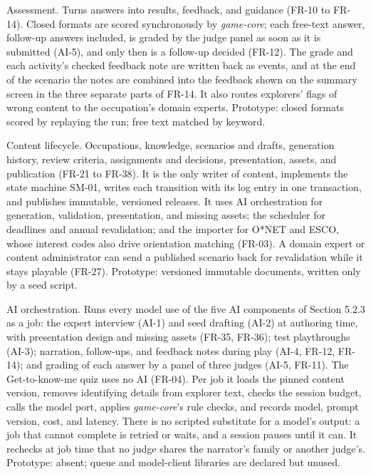 Assessment. Turns answers into results, feedback, and guidance (FR-10 to FR-14). Closed formats are scored synchronously by \textit{game-\allowbreak{}core}; each free-text answer, follow-up answers included, is graded by the judge panel as soon as it is submitted (AI-5), and only then is a follow-up decided (FR-12). The grade and each activity's checked feedback note are written back as events, and at the end of the scenario the notes are combined into the feedback shown on the summary screen in the three separate parts of FR-14. It also routes explorers' flags of wrong content to the occupation's domain experts. Prototype: closed formats scored by replaying the run; free text matched by keyword.

Content lifecycle. Occupations, knowledge, scenarios and drafts, generation history, review criteria, assignments and decisions, presentation, assets, and publication (FR-21 to FR-38). It is the only writer of content, implements the state machine SM-01, writes each transition with its log entry in one transaction, and publishes immutable, versioned releases. It uses AI orchestration for generation, validation, presentation, and missing assets; the scheduler for deadlines and annual revalidation; and the importer for O*NET and ESCO, whose interest codes also drive orientation matching (FR-03). A domain expert or content administrator can send a published scenario back for revalidation while it stays playable (FR-27). Prototype: versioned immutable documents, written only by a seed script.

AI orchestration. Runs every model use of the five AI components of Section 5.2.3 as a job: the expert interview (AI-1) and seed drafting (AI-2) at authoring time, with presentation design and missing assets (FR-35, FR-36); test playthroughs (AI-3); narration, follow-ups, and feedback notes during play (AI-4, FR-12, FR-14); and grading of each answer by a panel of three judges (AI-5, FR-11). The Get-\allowbreak{}to-\allowbreak{}know-\allowbreak{}me quiz uses no AI (FR-04). Per job it loads the pinned content version, removes identifying details from explorer text, checks the session budget, calls the model port, applies \textit{game-\allowbreak{}core}'s rule checks, and records model, prompt version, cost, and latency. There is no scripted substitute for a model's output: a job that cannot complete is retried or waits, and a session pauses until it can. It rechecks at job time that no judge shares the narrator's family or another judge's. Prototype: absent; queue and model-\allowbreak{}client libraries are declared but unused.

